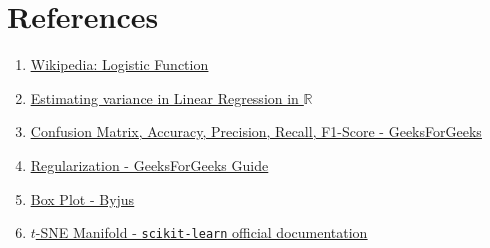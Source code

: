 \documentclass[12pt]{article}
\begin{document}
    \section*{References}
    \begin{enumerate}
        \item \href{https://en.wikipedia.org/wiki/Logistic_function}{\color{blue}\underline{Wikipedia: Logistic Function}}
        \item \href{https://www.tutorialspoint.com/how-to-find-residual-variance-of-a-linear-regression-model-in-r}{\color{blue}\underline{Estimating variance in Linear Regression in $\mathbb{R}$}}
        \item \href{https://www.geeksforgeeks.org/confusion-matrix-machine-learning/}{\color{blue}\underline{Confusion Matrix, Accuracy, Precision, Recall, F1-Score - GeeksForGeeks}}
        \item \href{https://www.geeksforgeeks.org/regularization-in-machine-learning/}{\color{blue}\underline{Regularization - GeeksForGeeks Guide}}
        \item \href{https://byjus.com/maths/box-plot/}{\color{blue}\underline{Box Plot - Byjus}}
        \item \href{https://scikit-learn.org/stable/modules/generated/sklearn.manifold.TSNE.html}{\color{blue}\underline{$t$-SNE Manifold - \texttt{scikit-learn} official documentation}}
    \end{enumerate}
\end{document}
